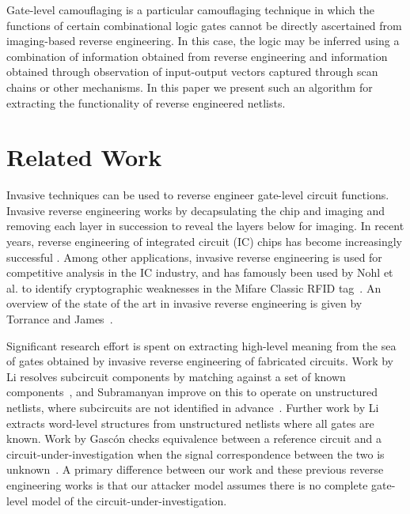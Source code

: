 \documentclass[proposal]{umassthesis}  %
\begin{document}
    Gate-level camouflaging is a particular camouflaging technique in which the functions of certain combinational logic gates cannot be directly ascertained from imaging-based reverse engineering. In this case, the logic may be inferred using a combination of information obtained from reverse engineering and information obtained through observation of input-output vectors captured through scan chains or other mechanisms. In this paper we present such an algorithm for extracting the functionality of reverse engineered netlists.





















\chapter{Related Work}

Invasive techniques can be used to reverse engineer gate-level circuit functions. Invasive reverse engineering works by decapsulating the chip and imaging and removing each layer in succession to reveal the layers below for imaging. 
%
In recent years, reverse engineering of integrated circuit (IC) chips has become increasingly successful \cite{torrance-11}. 
%
Among other applications, invasive reverse engineering is used for competitive analysis in the IC industry, and has famously been used by Nohl et al. to identify cryptographic weaknesses in the Mifare Classic RFID tag~\cite{nohl-08}. An overview of the state of the art in invasive reverse engineering is given by Torrance and James~\cite{torrance-11}.


Significant research effort is spent on extracting high-level meaning from the sea of gates obtained by invasive reverse engineering of fabricated circuits. Work by Li resolves subcircuit components by matching against a set of known components~\cite{li-12}, and Subramanyan improve on this to operate on unstructured netlists, where subcircuits are not identified in advance~\cite{subramanyan-13}. Further work by Li  extracts word-level structures from unstructured netlists where all gates are known. Work by Gasc{\'o}n  checks equivalence between a reference circuit and a circuit-under-investigation when the signal correspondence between the two is unknown~\cite{gascon-14}. A primary difference between our work and these previous reverse engineering works is that our attacker model assumes there is no complete gate-level model of the circuit-under-investigation.
\end{document}
